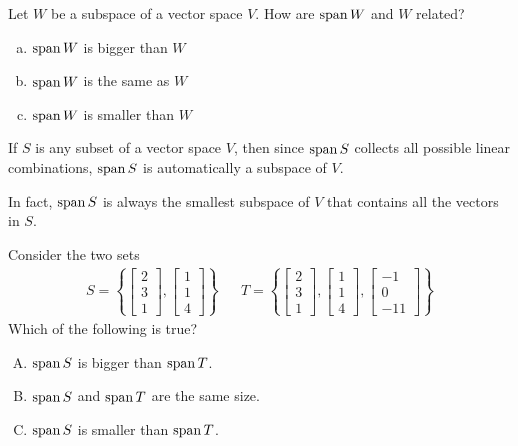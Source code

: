 \begin{activity}{5}
Let \(W\) be a subspace of a vector space \(V\).  How are \(\operatorname{span} W\) and \(W\) related?
\begin{enumerate}[(a)]
\item \(\operatorname{span} W\) is bigger than \(W\)
\item \(\operatorname{span} W\) is the same as \(W\)
\item \(\operatorname{span} W\) is smaller than \(W\)
\end{enumerate}
\end{activity}

\begin{fact}
  If \(S\) is any subset of a vector space \(V\), then
  since \(\operatorname{span} S\) collects all possible linear combinations,
  \(\operatorname{span} S\) is automatically a subspace of \(V\).

  \vspace{1em}

  In fact, \(\operatorname{span} S\) is always the smallest
  subspace of \(V\) that contains all the vectors in \(S\).
\end{fact}


\begin{activity}{10}
  Consider the two sets
  \begin{align*}
    S=\left\{
  \begin{bmatrix}2\\3\\1\end{bmatrix},
  \begin{bmatrix}1\\1\\4\end{bmatrix}
  \right\} & &
    T=\left\{
  \begin{bmatrix}2\\3\\1\end{bmatrix},
  \begin{bmatrix}1\\1\\4\end{bmatrix},
  \begin{bmatrix}-1\\0\\-11\end{bmatrix}
  \right\}
  \end{align*}
  Which of the following is true?

	\begin{enumerate}[(A)]
	\item \(\operatorname{span} S\) is bigger than \(\operatorname{span} T\).
	\item \(\operatorname{span} S\) and \(\operatorname{span} T\) are the same size.
	\item \(\operatorname{span} S\) is smaller than \(\operatorname{span} T\).
	\end{enumerate}

\end{activity}

